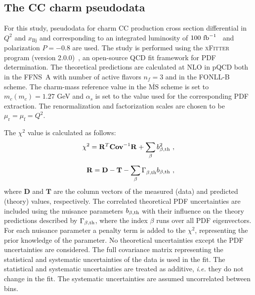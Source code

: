 \documentclass[pdftex,twocolumn,epjc3]{svjour3}          %
\newcommand{\chisq}{\ensuremath{\chi^2}\xspace}
\newcommand{\xfitter} {\textsc{xFitter}\xspace}
\newcommand{\xbj}{\ensuremath{x_{\text{Bj}}}\xspace}
\newcommand{\fonll} {{FONLL-B}\xspace}
\newcommand{\ffns} {{FFNS~A}\xspace}
\begin{document}
\subsection{The CC  charm pseudodata}
\label{sec:pseudodata}

For this study, pseudodata for charm CC production cross section
differential in $Q^2$ and \xbj and corresponding to an integrated
luminosity of $100{\rm~fb}^{-1}$~\cite{AbelleiraFernandez:2012cc,Blumlein:1992we} and
polarization $P=-0.8$ are used.
%
%
The study is performed using the \xfitter program (version
2.0.0)~\cite{Alekhin:2014irh}, an open-source QCD fit framework for
PDF determination. The theoretical predictions are calculated at NLO
in pQCD both in the \ffns with number of active flavors $n_f = 3$ and
in the \fonll scheme. The charm-mass reference value in the
$\overline{\mbox{MS}}$ scheme is set to $m_c(m_c) = 1.27$ GeV and
$\alpha_s$ is set to the value used for the corresponding PDF
extraction. The renormalization and factorization scales are chosen to
be $\mu_\mathrm{r} = \mu_\mathrm{f} = Q^2$.

The \chisq value is calculated as follows:
\begin{equation}
\begin{split}
  \chisq = \mathbf{R}^{T}_{} \mathbf{Cov}^{-1}_{} \mathbf{R}_{} + \sum_{\beta} b_{\beta,\rm th}^2 \ , \\[5pt]
  \mathbf{R} = \mathbf{D} - \mathbf{T} - \sum_{\beta} \Gamma^{}_{\beta,\rm th} b_{\beta,\rm th} \ ,
\label{eq:chisq}
\end{split}
\end{equation}
%
where $\mathbf{D}$ and $\mathbf{T}$ are the column vectors of the
measured (data) and predicted (theory) values, respectively.  The
correlated theoretical PDF uncertainties are included using the
nuisance parameters $b_{\beta, \rm th}$ with their influence on the
theory predictions described by $\Gamma_{\beta,\rm th}$, where the
index $\beta$ runs over all PDF eigenvectors. For each nuisance
parameter a penalty term is added to the \chisq, representing the
prior knowledge of the parameter. No theoretical uncertainties except
the PDF uncertainties are considered. The full covariance matrix
representing the statistical and systematic uncertainties of the data
is used in the fit. The statistical and systematic uncertainties are
treated as additive, \textit{i.e.} they do not change in the fit. The
systematic uncertainties are assumed uncorrelated between bins.
\end{document}
